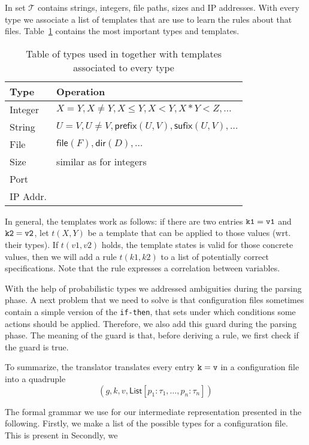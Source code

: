 In \app set $\mathcal{T}$ contains strings, integers, file paths, 
sizes and IP addresses. With every type we associate a list of templates 
that are use to learn the rules about that files. Table~\ref{table:kysymys} contains
the most important types and templates.

\begin{table}
  \begin{tabular}{| l |  l |}
    \hline
    Type & Operation  \\ \hline
    Integer & $X = Y, X\neq Y, X \leq Y, X < Y, X * Y < Z, \ldots $\\ \hline
    String & $U = V, U \neq V, \textsf{prefix}(U,V), \textsf{sufix}(U,V), \ldots$   \\ \hline
    File & $\textsf{file}(F), \textsf{dir}(D),\ldots$   \\ \hline
    Size & similar as for integers   \\ \hline
    Port &    \\ \hline
    IP Addr.  &   \\
    
    \hline
  \end{tabular}
\caption{Table of types used in \app together with templates associated to every type}
\label{table:kysymys}
\end{table}


In general, the templates work as follows: if there are two entries ${\tt {k1 = v1}}$ and 
${\tt {k2 = v2}}$, let $t(X, Y)$ be a template that can be applied to those values (wrt. their types).
If $t(v1, v2)$ holds, \ie the template states is valid for those concrete values, then we will add a rule
$t(k1, k2)$ to a list of potentially correct specifications. Note that the rule expresses a correlation between variables.

With the help of probabilistic types we addressed ambiguities during the parsing phase. A next problem that we need to solve
is that configuration files sometimes contain a simple version of the {\tt {if-then}}, that 
sets under which conditions some actions should be applied. Therefore, we also add this guard during the parsing phase. The meaning 
of the guard is that, before deriving a rule, we first check if the guard is true.

To summarize, the translator translates every entry ${\tt {k = v}}$ in a configuration file into a quadruple 
$$(g,k,v,\textsf{List}[p_1:\tau_1, \ldots, p_n:\tau_n])$$

\iffalse
The formal grammar we use for our intermediate representation presented in the following. 
Firstly, we make a list of the possible types for a configuration file. This is present in 
Secondly, we 


